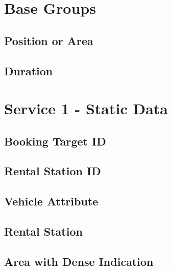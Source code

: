 \section{Base Groups}
\label{sec:Datenmodell:Baisgruppen}

\subsection*{Position or Area}



\subsection*{Duration}



\section{Service 1 - Static Data}
\label{sec:Datenmodell:Dienst1}

\subsection*{Booking Target ID}



\subsection*{Rental Station ID}



\subsection*{Vehicle Attribute}



\subsection*{Rental Station}



\subsection*{Area with Dense Indication}



